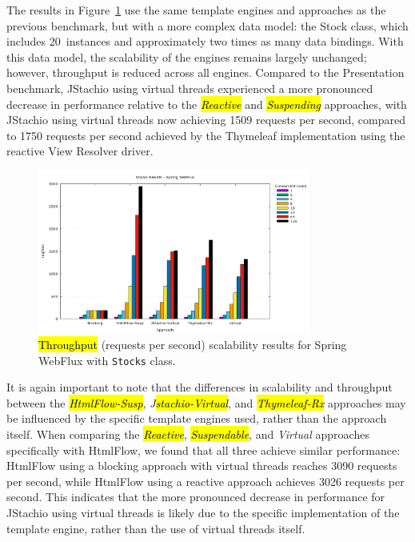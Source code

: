 \documentclass[software,article,accept,pdftex,moreauthors]{Definitions/mdpi}
\begin{document}
The results in Figure~\ref{fig:stocks-webflux-jmeter} use the same template
engines and approaches as the previous benchmark, but with a more complex data
model: the Stock class, which includes 20~instances and approximately two times
as many data bindings. With this data model, the scalability of the engines
remains largely unchanged; however, throughput is reduced across all engines.
Compared to the Presentation benchmark, JStachio using virtual threads
experienced a more pronounced decrease in performance relative to the
\textit{\hl{Reactive}} and \textit{\hl{Suspending}} approaches, with JStachio using
virtual threads now achieving 1509 requests per second, compared to 1750
requests per second achieved by the Thymeleaf implementation using the reactive
View Resolver driver.

\begin{figure}[H]
\vspace{-6pt}
     \includegraphics[width=0.8\textwidth]{./Graphs/stocks-webflux-jmeter.png}
     \caption{\hl{Throughput} %
 (requests per second) scalability results for Spring WebFlux with \texttt{Stocks} class.}\label{fig:stocks-webflux-jmeter}
\end{figure}

It is again important to note that the differences in scalability and
throughput between the \textit{\hl{HtmlFlow-Susp}}, \textit{J\hl{stachio-Virtual}}, and
\textit{\hl{Thymeleaf-Rx}} approaches may be influenced by the specific template
engines used, rather than the approach itself. When comparing the
\textit{\hl{Reactive}}, \textit{\hl{Suspendable}}, and \textit{Virtual} approaches
specifically with HtmlFlow, we found that all three achieve similar
performance: HtmlFlow using a blocking approach with virtual threads reaches
3090 requests per second, while HtmlFlow using a reactive approach achieves
3026 requests per second. This indicates that the more pronounced decrease in
performance for JStachio using virtual threads is likely due to the specific
implementation of the template engine, rather than the use of virtual threads
itself.
\end{document}
